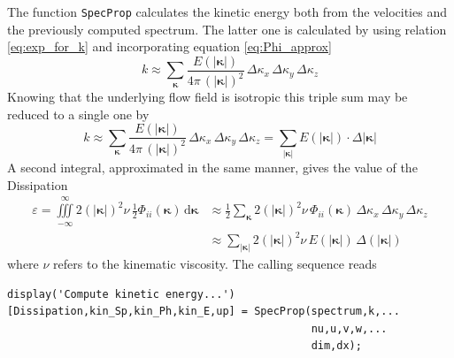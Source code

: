 \documentclass[preprint,12pt,ntfdMod]{elsarticle}
\begin{document}
\begin{par}

  The function \lstinline!SpecProp! calculates the kinetic energy both
  from the velocities and the previously computed spectrum. The latter
  one is calculated by using relation \eqref{eq:exp_for_k} and
  incorporating equation \eqref{eq:Phi_approx}
  \begin{equation}
      k\approx\sum\limits_{\boldsymbol\kappa}\frac{E(|\boldsymbol\kappa|)}{4\pi\,
      (|\boldsymbol\kappa|)^2}\,\Delta\kappa_x\,\Delta\kappa_y\,
      \Delta\kappa_z
  \end{equation}
Knowing that the underlying flow field is isotropic this triple sum may be
reduced to a single one by
  \begin{equation}
      k\approx\sum\limits_{\boldsymbol\kappa}\frac{E(|\boldsymbol\kappa|)}{4\pi\,
      (|\boldsymbol\kappa|)^2}\,\Delta\kappa_x\,\Delta\kappa_y\,
      \Delta\kappa_z=
      \sum\limits_{|\boldsymbol\kappa|}E(|\boldsymbol\kappa|)\cdot\Delta|\boldsymbol\kappa|
  \end{equation}
  A second integral, approximated in the same manner, gives the value
  of the Dissipation
  \begin{align}
      \label{eq:Phi_approx}
      \varepsilon=\iiint\limits_{-\infty}^{\infty}2(|\boldsymbol\kappa|)^2\nu\,\frac{1}{2}\Phi_{ii}(\boldsymbol\kappa)\,\mathrm{d}\boldsymbol\kappa
      &\displaystyle\approx\frac{1}{2}\sum\limits_{\boldsymbol\kappa}2(|\boldsymbol\kappa|)^2\nu\,\Phi_{ii}(\boldsymbol\kappa)
      \,\Delta\kappa_x\,\Delta\kappa_y\,\Delta\kappa_z\\
      &\displaystyle\approx\sum\limits_{|\boldsymbol\kappa|}2(|\boldsymbol\kappa|)^2
      \nu\,E(|\boldsymbol\kappa|)\,\Delta(|\boldsymbol\kappa|)
  \end{align}
  where $\nu$ refers to the kinematic viscosity.
  The calling sequence reads

\end{par} \vspace{1em}
\begin{verbatim}
display('Compute kinetic energy...')
[Dissipation,kin_Sp,kin_Ph,kin_E,up] = SpecProp(spectrum,k,...
                                                nu,u,v,w,...
                                                dim,dx);
\end{verbatim}
\begin{par}



\end{par} \vspace{1em}
\end{document}
